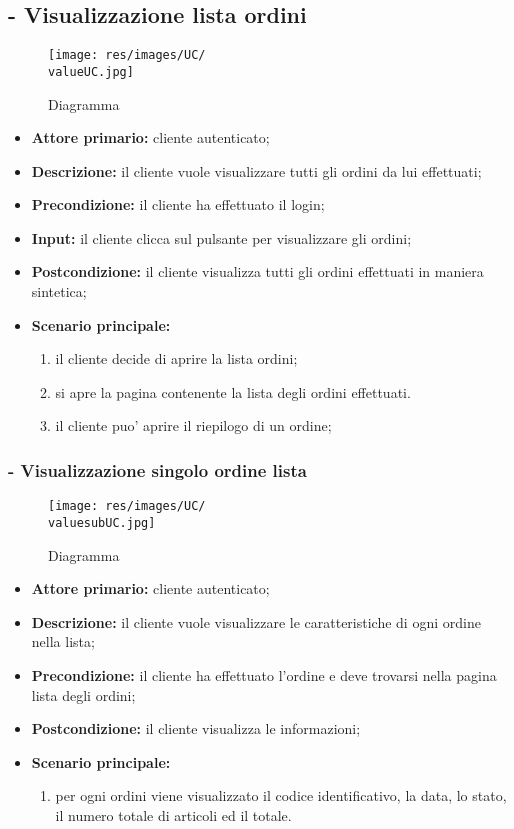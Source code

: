 \stepUserCase
\subsection{ - Visualizzazione lista ordini}
\begin{figure}[H]
    \centering
    \texttt{[image: res/images/UC/\\valueUC.jpg]}
    \caption{Diagramma }
\end{figure}
\begin{itemize}
    \item \textbf{Attore primario:} cliente autenticato;
    \item \textbf{Descrizione:} il cliente vuole visualizzare tutti gli ordini da lui effettuati;
    \item \textbf{Precondizione:} il cliente ha effettuato il login;
    \item \textbf{Input:} il cliente clicca sul pulsante per visualizzare gli ordini;
    \item \textbf{Postcondizione:} il cliente visualizza tutti gli ordini effettuati in maniera sintetica;
    \item \textbf{Scenario principale:}
          \begin{enumerate}
              \item il cliente decide di aprire la lista ordini;
              \item si apre la pagina contenente la lista degli ordini effettuati.
            \item il cliente puo' aprire il riepilogo di un ordine;
          \end{enumerate}
\end{itemize}

\stepsubUserCase
\subsubsection{ - Visualizzazione singolo ordine lista }
\begin{figure}[H]
    \centering
    \texttt{[image: res/images/UC/\\valuesubUC.jpg]}
    \caption{Diagramma }
\end{figure}
\begin{itemize}
    \item \textbf{Attore primario:} cliente autenticato;
    \item \textbf{Descrizione:} il cliente vuole visualizzare le caratteristiche di ogni ordine nella lista;
    \item \textbf{Precondizione:} il cliente ha effettuato l'ordine e deve trovarsi nella pagina lista degli ordini;
    \item \textbf{Postcondizione:} il cliente visualizza le informazioni;
    \item \textbf{Scenario principale:}
          \begin{enumerate}
              \item per ogni ordini viene visualizzato il codice identificativo, la data, lo stato, il numero totale di articoli ed il totale.
          \end{enumerate}
\end{itemize}


